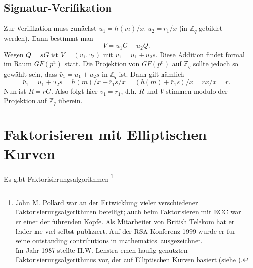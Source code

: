 \begin{refsegment}
\par
\subsection{Signatur-Verifikation}

Zur Verifikation muss zunächst $u_1=h(m)/x$, $u_2=\bar r_1/x$ (in ${\mathbb Z}_q$ gebildet werden). Dann bestimmt man
$$ V=u_1G+u_2Q .
$$
Wegen $Q=sG$ ist $V=(v_1,v_2)$ mit $v_1=u_1+u_2s$. Diese Addition findet formal im Raum $GF(p^n)$ statt. Die Projektion von $GF(p^n)$ auf ${\mathbb Z}_q$ sollte jedoch so gewählt sein, dass $\bar v_1=u_1+u_2s$ in ${\mathbb Z}_q$ ist.
Dann gilt nämlich
$$ \bar v_1=u_1+u_2s=h(m)/x+\bar r_1 s/x=(h(m)+\bar r_1s)/x=rx/x=r .
$$
Nun ist $R=rG$. Also folgt hier $\bar v_1=\bar r_1$, d.h. $R$ und $V$ stimmen modulo der Projektion auf ${\mathbb Z}_q$ überein.


\hypertarget{faktell}{}
\section{Faktorisieren mit Elliptischen Kurven} \label{ECC-Factorisation}

Es gibt Faktorisierungsalgorithmen%
\footnote{John M. Pollard  war an der
Entwicklung vieler verschiedener Faktorisierungsalgorithmen beteiligt; auch
beim Faktorisieren mit ECC war er einer der führenden Köpfe. Als Mitarbeiter
von British Telekom hat er leider nie viel selbst publiziert. Auf der RSA
Konferenz 1999 wurde er für seine \glqq outstanding contributions in
mathematics\grqq~ausgezeichnet.\\
Im Jahr 1987 stellte H.W. Lenstra einen häufig genutzten
Faktorisierungsalgorithmus vor, der auf Elliptischen Kurven basiert
(siehe \cite{Lenstra1987}).

}
\end{refsegment}
